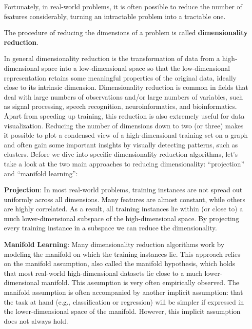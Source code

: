 Fortunately, in real-world problems, it is often possible to reduce the number of features considerably, turning 
an intractable problem into a tractable one.

The procedure of reducing the dimensions of a problem is called \textbf{dimensionality reduction}.
\ed

In general dimensionality reduction is the transformation of data from a high-dimensional space into a 
low-dimensional space so that the low-dimensional representation retains some meaningful properties of the original 
data, ideally close to its intrinsic dimension. Dimensionality reduction is common in fields that deal with large 
numbers of observations and/or large numbers of variables, such as signal processing, speech recognition, 
neuroinformatics, and bioinformatics. \v

Apart from speeding up training, this reduction is also extremely useful for data visualization. Reducing the number
of dimensions down to two (or three) makes it possible to plot a condensed view of a high-dimensional training set on
a graph and often gain some important insights by visually detecting patterns, such as clusters. \v

Before we dive into specific dimensionality reduction algorithms, let's take a look at the two main approaches to
reducing dimensionality: ``projection'' and ``manifold learning'':
\bit
\item \textbf{Projection}: In most real-world problems, training instances are not spread out uniformly across all 
dimensions. Many features are almost constant, while others are highly correlated. As a result, all training 
instances lie within (or close to) a much lower-dimensional subspace of the high-dimensional space. By projecting 
every training instance in a subspace we can reduce the dimensionality.
\item \textbf{Manifold Learning}: Many dimensionality reduction algorithms work by modeling the manifold on which the
training instances lie. This approach relies on the manifold assumption, also called the manifold hypothesis, which 
holds that most real-world high-dimensional datasets lie close to a much lower-dimensional manifold. This assumption 
is very often empirically observed. The manifold assumption is often accompanied by another implicit assumption: that
the task at hand (e.g., classification or regression) will be simpler if expressed in the lower-dimensional space of 
the manifold. However, this implicit assumption does not always hold. 
\eit

